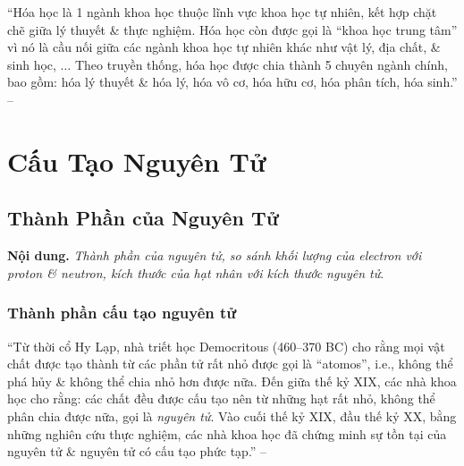 \documentclass[oneside]{book}
\numberwithin{equation}{section}
\begin{document}
``Hóa học là 1 ngành khoa học thuộc lĩnh vực khoa học tự nhiên, kết hợp chặt chẽ giữa lý thuyết \& thực nghiệm. Hóa học còn được gọi là ``khoa học trung tâm'' vì nó là cầu nối giữa các ngành khoa học tự nhiên khác như vật lý, địa chất, \& sinh học, $\ldots$ Theo truyền thống, hóa học được chia thành 5 chuyên ngành chính, bao gồm: hóa lý thuyết \& hóa lý, hóa vô cơ, hóa hữu cơ, hóa phân tích, hóa sinh.'' -- \cite[p. 11]{SGK_Hoa_Hoc_10_Chan_Troi_Sang_Tao}


\chapter{Cấu Tạo Nguyên Tử}

\section{Thành Phần của Nguyên Tử}
\textbf{Nội dung.} \textit{Thành phần của nguyên tử, so sánh khối lượng của electron với proton \& neutron, kích thước của hạt nhân với kích thước nguyên tử}.

\subsection{Thành phần cấu tạo nguyên tử}
``Từ thời cổ Hy Lạp, nhà triết học Democritous (460--370 BC) cho rằng mọi vật chất được tạo thành từ các phần tử rất nhỏ được gọi là ``atomos'', i.e., không thể phá hủy \& không thể chia nhỏ hơn được nữa. Đến giữa thế kỷ XIX, các nhà khoa học cho rằng: các chất đều được cấu tạo nên từ những hạt rất nhỏ, không thể phân chia được nữa, gọi là \textit{nguyên tử}. Vào cuối thế kỷ XIX, đầu thế kỷ XX, bằng những nghiên cứu thực nghiệm, các nhà khoa học đã chứng minh sự tồn tại của nguyên tử \& nguyên tử có cấu tạo phức tạp.'' -- \cite[p. 13]{SGK_Hoa_Hoc_10_Chan_Troi_Sang_Tao}
\end{document}
